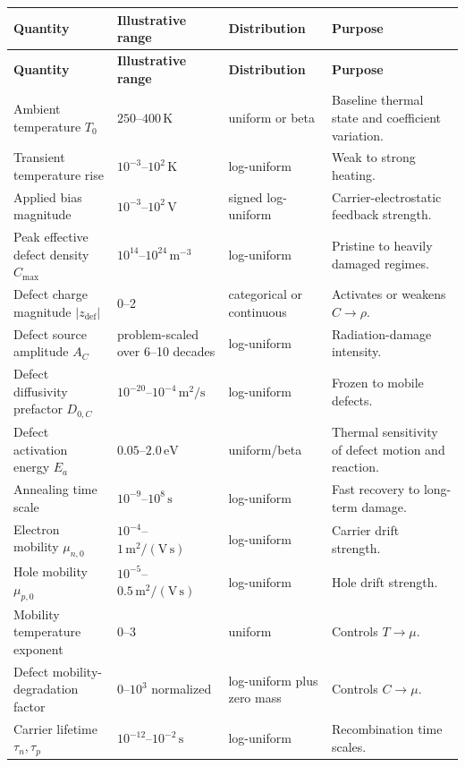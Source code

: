 \documentclass[11pt]{article}
\begin{document}
\small
\begin{longtable}{p{}p{}p{}p{}}
\toprule
\textbf{Quantity} & \textbf{Illustrative range} & \textbf{Distribution} & \textbf{Purpose} \\
\midrule
\endfirsthead
\toprule
\textbf{Quantity} & \textbf{Illustrative range} & \textbf{Distribution} & \textbf{Purpose} \\
\midrule
\endhead
Ambient temperature \(T_0\) & \(250\)--\(400\,\mathrm{K}\) & uniform or beta & Baseline thermal state and coefficient variation. \\
Transient temperature rise & \(10^{-3}\)--\(10^{2}\,\mathrm{K}\) & log-uniform & Weak to strong heating. \\
Applied bias magnitude & \(10^{-3}\)--\(10^{2}\,\mathrm{V}\) & signed log-uniform & Carrier-electrostatic feedback strength. \\
Peak effective defect density \(C_{\max}\) & \(10^{14}\)--\(10^{24}\,\mathrm{m^{-3}}\) & log-uniform & Pristine to heavily damaged regimes. \\
Defect charge magnitude \(|z_{\mathrm{def}}|\) & \(0\)--2 & categorical or continuous & Activates or weakens \(C\rightarrow\rho\). \\
Defect source amplitude \(A_C\) & problem-scaled over 6--10 decades & log-uniform & Radiation-damage intensity. \\
Defect diffusivity prefactor \(D_{0,C}\) & \(10^{-20}\)--\(10^{-4}\,\mathrm{m^2/s}\) & log-uniform & Frozen to mobile defects. \\
Defect activation energy \(E_a\) & \(0.05\)--\(2.0\,\mathrm{eV}\) & uniform/beta & Thermal sensitivity of defect motion and reaction. \\
Annealing time scale & \(10^{-9}\)--\(10^{8}\,\mathrm{s}\) & log-uniform & Fast recovery to long-term damage. \\
Electron mobility \(\mu_{n,0}\) & \(10^{-4}\)--\(1\,\mathrm{m^2/(V\,s)}\) & log-uniform & Carrier drift strength. \\
Hole mobility \(\mu_{p,0}\) & \(10^{-5}\)--\(0.5\,\mathrm{m^2/(V\,s)}\) & log-uniform & Hole drift strength. \\
Mobility temperature exponent & \(0\)--3 & uniform & Controls \(T\rightarrow\mu\). \\
Defect mobility-degradation factor & \(0\)--\(10^{3}\) normalized & log-uniform plus zero mass & Controls \(C\rightarrow\mu\). \\
Carrier lifetime \(\tau_n,\tau_p\) & \(10^{-12}\)--\(10^{-2}\,\mathrm{s}\) & log-uniform & Recombination time scales. \\

\end{longtable}
\end{document}
